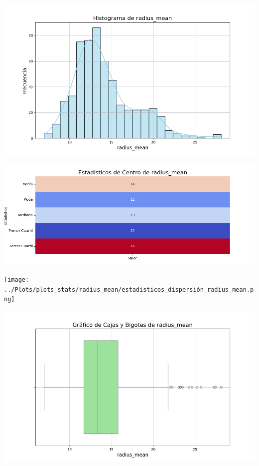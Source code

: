 \documentclass[a4paper, 12pt]{article}
\begin{document}
	\includegraphics[width=\textwidth]{../Plots/plots_stats/radius_mean/histograma_radius_mean.png}




\includegraphics[width=\textwidth]{../Plots/plots_stats/radius_mean/estadisticas_centro_radius_mean.png}




\texttt{[image: ../Plots/plots\_stats/radius\_mean/estadisticos\_dispersión\_radius\_mean.png]}



\includegraphics[width=\textwidth]{../Plots/plots_stats/radius_mean/boxplot_radius_mean.png}
\end{document}
